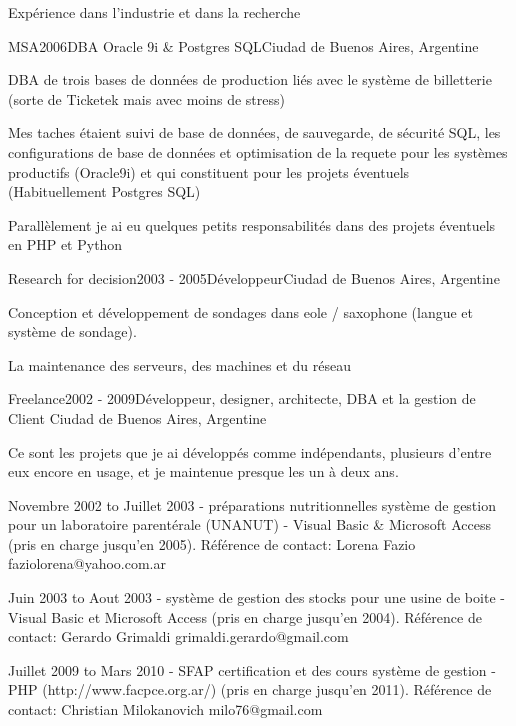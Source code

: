 \documentclass{resume} %
\begin{document}
\begin{rSection}{Exp\'{e}rience dans l'industrie et dans la recherche}
\begin{rSubsection}{MSA}{2006}{DBA Oracle 9i \& Postgres SQL}{Ciudad de Buenos Aires, Argentine}
	\item DBA de trois bases de donn\'{e}es de production li\'{e}s avec le syst\`{e}me de billetterie (sorte de Ticketek mais avec moins de stress)
	\item Mes taches \'{e}taient suivi de base de donn\'{e}es, de sauvegarde, de s\'{e}curit\'{e} SQL, les configurations de base de donn\'{e}es et optimisation de la requete pour les syst\`{e}mes productifs (Oracle9i) et qui constituent pour les projets \'{e}ventuels (Habituellement Postgres SQL)
	\item Parall\`{e}lement je ai eu quelques petits responsabilit\'{e}s dans des projets \'{e}ventuels en PHP et Python 
\end{rSubsection}


\begin{rSubsection}{Research for decision}{2003 - 2005}{D\'{e}veloppeur}{Ciudad de Buenos Aires, Argentine}
	\item Conception et d\'{e}veloppement de sondages dans eole / saxophone (langue et syst\`{e}me de sondage).
	\item La maintenance des serveurs, des machines et du r\'{e}seau
\end{rSubsection}

\begin{rSubsection}{Freelance}{2002 - 2009}{D\'{e}veloppeur, designer, architecte, DBA et la gestion de Client} {Ciudad de Buenos Aires, Argentine}
	\item Ce sont les projets que je ai d\'{e}velopp\'{e}s comme ind\'{e}pendants, plusieurs d'entre eux encore en usage, et je maintenue presque les un \`{a} deux ans.
	\item  Novembre 2002 to Juillet 2003 - pr\'{e}parations nutritionnelles syst\`{e}me de gestion pour un laboratoire parent\'{e}rale (UNANUT) - Visual Basic \& Microsoft Access (pris en charge jusqu'en 2005). R\'{e}f\'{e}rence de contact: Lorena Fazio faziolorena@yahoo.com.ar
	\item  Juin 2003 to Aout 2003 - syst\`{e}me de gestion des stocks pour une usine de boite - Visual Basic et Microsoft Access (pris en charge jusqu'en 2004). R\'{e}f\'{e}rence de contact: Gerardo Grimaldi grimaldi.gerardo@gmail.com
	\item Juillet 2009 to Mars 2010 - SFAP certification et des cours syst\`{e}me de gestion - PHP (http://www.facpce.org.ar/) (pris en charge jusqu'en 2011). R\'{e}f\'{e}rence de contact: Christian Milokanovich milo76@gmail.com
\end{rSubsection}



\end{rSection}
\end{document}
